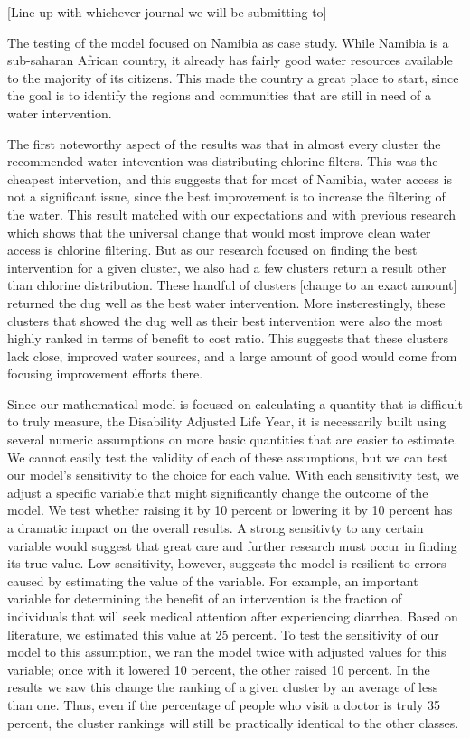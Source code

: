 [Line up with whichever journal we will be submitting to]

The testing of the model focused on Namibia as case study.
While Namibia is a sub-saharan African country, it already has fairly good water resources available to the majority of its citizens.
This made the country a great place to start, since the goal is to identify the regions and communities that are still in need of a water intervention.  

The first noteworthy aspect of the results was that in almost every cluster the recommended water intevention was distributing chlorine filters.
This was the cheapest intervetion, and this suggests that for most of Namibia, water access is not a significant issue, since the best improvement is to increase the filtering of the water.
This result matched with our expectations and with previous research which shows that the universal change that would most improve clean water access is chlorine filtering.
But as our research focused on finding the best intervention for a given cluster, we also had a few clusters return a result other than chlorine distribution.
These handful of clusters [change to an exact amount] returned the dug well as the best water intervention.
More insterestingly, these clusters that showed the dug well as their best intervention were also the most highly ranked in terms of benefit to cost ratio.  
This suggests that these clusters lack close, improved water sources, and a large amount of good would come from focusing improvement efforts there.

Since our mathematical model is focused on calculating a quantity that is difficult to truly measure, the Disability Adjusted Life Year, it is necessarily built using several numeric assumptions on more basic quantities that are easier to estimate.
We cannot easily test the validity of each of these assumptions, but we can test our model's sensitivity to the choice for each value.
With each sensitivity test, we adjust a specific variable that might significantly change the outcome of the model.
We test whether raising it by 10 percent or lowering it by 10 percent has a dramatic impact on the overall results.
A strong sensitivty to any certain variable would suggest that great care and further research must occur in finding its true value.
Low sensitivity, however, suggests the model is resilient to errors caused by estimating the value of the variable.
For example, an important variable for determining the benefit of an intervention is the fraction of individuals that will seek medical attention after experiencing diarrhea.
Based on literature, we estimated this value at 25 percent.
To test the sensitivity of our model to this assumption, we ran the model twice with adjusted values for this variable; once with it lowered 10 percent, the other raised 10 percent.
In the results we saw this change the ranking of a given cluster by an average of less than one.
Thus, even if the percentage of people who visit a doctor is truly 35 percent, the cluster rankings will still be practically identical to the other classes.  


